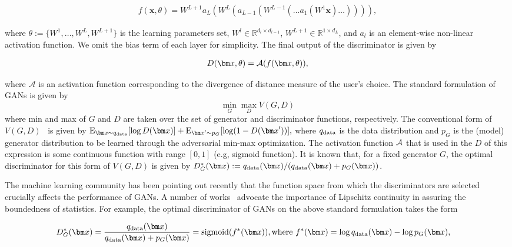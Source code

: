 \begin{align}
	f({\bm x}, \theta) = W^{L+1} a_L (W^L (a_{L-1}(W^{L-1}(\dots a_1(W^1{\bm x})\dots)))),
\end{align}

where $\theta:=\{W^1,\dots, W^L, W^{L+1} \}$ is the learning parameters set, $W^l\in \mathbb{R}^{d_l \times d_{l-1}}$, $W^{L+1}\in \mathbb{R}^{1\times{d_L}}$, and $a_l$ is an element-wise non-linear activation function. We omit the bias term of each layer for simplicity. The final output of the discriminator is given by

\begin{align}
	D({\bm x}, \theta) =  {\rm \mathcal{A}}(f({\bm x}, \theta)),
\end{align}

where $\mathcal{A}$ is an activation function corresponding to the divergence of distance measure of the user's choice. The standard formulation of GANs is given by
$$\min_{G} \max_{D} V(G, D)$$ where min and max of $G$ and $D$ are taken over the set of generator and discriminator functions, respectively. The conventional form of $V(G,D)$~\cite[]{goodfellow2014generative} is given by
$\mathrm{E}_{{\bm x}\sim q_{\rm data}} [\log D({\bm x})] + \mathrm{E}_{{\bm x}'\sim p_G} [\log(1-D({\bm x}'))], \label{eq:stdgan}$
where $q_{\rm data}$ is the data distribution and $p_G$ is the (model) generator distribution to be learned through the adversarial min-max optimization. The activation function ${\rm \mathcal{A}}$ that is used in the $D$ of this expression is some continuous function with range $[0,1]$ (e.g, sigmoid function). It is known that, for a fixed generator $G$, the optimal discriminator for this form of $V(G,D)$ is given by $D^*_G({\bm x}) := q_{\rm data}({\bm x})/(q_{\rm data}({\bm x}) + p_{G}({\bm x}))$.

The machine learning community has been pointing out recently that the function space from which the discriminators are selected crucially affects the performance of GANs. A number of works~\cite[]{uehara2016generative, qi2017loss, gulrajani2017improved} advocate the importance of Lipschitz continuity in assuring the boundedness of statistics. For example, the optimal discriminator of GANs on the above standard formulation takes the form

\begin{align}
	D_{G}^*({\bm x}) & = \frac{q_{\rm data}({\bm x})}{q_{\rm data}({\bm x})+p_G({\bm x})} = {\rm sigmoid}(f^*({\bm x})),
	\text{where }f^*({\bm x}) = \log q_{\rm data}({\bm x}) - \log p_G({\bm x}),
\end{align}

